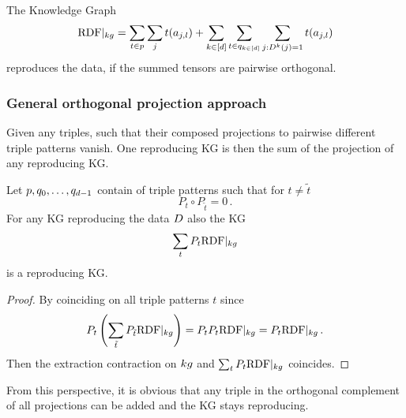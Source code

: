 \begin{theorem}
	The Knowledge Graph
		\[ {\mathrm{RDF}}|_{kg} = \sum_{t \in p} \sum_{j} t(a_{j,l})
		+ \sum_{k\in[d]} \sum_{t \in q_{k\in[d]}} \sum_{j : D^{k}(j)=1} t(a_{j,l})\]
	reproduces the data, if the summed tensors are pairwise orthogonal.
\end{theorem}

\subsubsection{General orthogonal projection approach}

Given any triples, such that their composed projections to pairwise different triple patterns vanish. 
One reproducing KG is then the sum of the projection of any reproducing KG.



\begin{theorem}
	Let  $p,q_{0},\ldots,q_{d-1}$ contain of triple patterns such that for $t\neq \tilde{t}$
		\[ P_t \circ P_{\tilde{t}} = 0 \, . \]
	For any KG reproducing the data $D$ also the KG 
		\[ \sum_{t} P_t {\mathrm{RDF}}|_{kg} \]
	is a reproducing KG.
\end{theorem}
\begin{proof}
	By coinciding on all triple patterns $t$ since
		\[ P_t \left( \sum_{\tilde{t}} P_{\tilde{t}} {\mathrm{RDF}}|_{kg}  \right)  
		= P_t P_t {\mathrm{RDF}}|_{kg}  
		= P_t {\mathrm{RDF}}|_{kg}  \, .   \]
	Then the extraction contraction on $kg$ and $ \sum_{t} P_t{\mathrm{RDF}}|_{kg} $ coincides.
\end{proof}

From this perspective, it is obvious that any triple in the orthogonal complement of all projections can be added and the KG stays reproducing.


